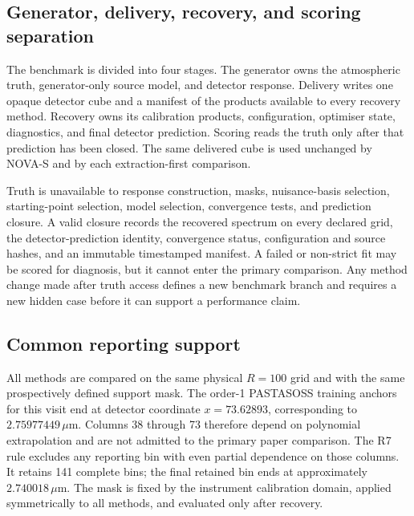 \subsection{Generator, delivery, recovery, and scoring separation}

The benchmark is divided into four stages. The generator owns the atmospheric
truth, generator-only source model, and detector response. Delivery writes one
opaque detector cube and a manifest of the products available to every recovery
method. Recovery owns its calibration products, configuration, optimiser state,
diagnostics, and final detector prediction. Scoring reads the truth only after
that prediction has been closed. The same delivered cube is used unchanged by
NOVA-S and by each extraction-first comparison.

Truth is unavailable to response construction, masks, nuisance-basis selection,
starting-point selection, model selection, convergence tests, and prediction
closure. A valid closure records the recovered spectrum on every declared grid,
the detector-prediction identity, convergence status, configuration and source
hashes, and an immutable timestamped manifest. A failed or non-strict fit may be
scored for diagnosis, but it cannot enter the primary comparison. Any method
change made after truth access defines a new benchmark branch and requires a new
hidden case before it can support a performance claim.

\subsection{Common reporting support}

All methods are compared on the same physical $R=100$ grid and with the same
prospectively defined support mask. The order-1 PASTASOSS training anchors for
this visit end at detector coordinate $x=73.62893$, corresponding to
$2.75977449\,\mu\mathrm{m}$. Columns 38 through 73 therefore depend on polynomial
extrapolation and are not admitted to the primary paper comparison. The R7 rule
excludes any reporting bin with even partial dependence on those columns. It
retains 141 complete bins; the final retained bin ends at approximately
$2.740018\,\mu\mathrm{m}$. The mask is fixed by the instrument calibration domain,
applied symmetrically to all methods, and evaluated only after recovery.


